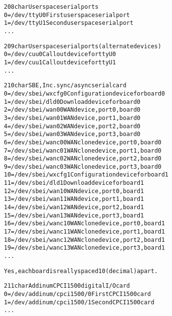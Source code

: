 \documentclass[a4paper,8pt,english]{sphinxmanual}
\begin{document}
\begin{alltt}
 208 char       User space serial ports
                  0 = /dev/ttyU0                First user space serial port
                  1 = /dev/ttyU1                Second user space serial port
                    ...

 209 char       User space serial ports (alternate devices)
                  0 = /dev/cuu0                 Callout device for ttyU0
                  1 = /dev/cuu1                 Callout device for ttyU1
                    ...

 210 char       SBE, Inc. sync/async serial card
                  0 = /dev/sbei/wxcfg0          Configuration device for board 0
                  1 = /dev/sbei/dld0            Download device for board 0
                  2 = /dev/sbei/wan00           WAN device, port 0, board 0
                  3 = /dev/sbei/wan01           WAN device, port 1, board 0
                  4 = /dev/sbei/wan02           WAN device, port 2, board 0
                  5 = /dev/sbei/wan03           WAN device, port 3, board 0
                  6 = /dev/sbei/wanc00          WAN clone device, port 0, board 0
                  7 = /dev/sbei/wanc01          WAN clone device, port 1, board 0
                  8 = /dev/sbei/wanc02          WAN clone device, port 2, board 0
                  9 = /dev/sbei/wanc03          WAN clone device, port 3, board 0
                 10 = /dev/sbei/wxcfg1          Configuration device for board 1
                 11 = /dev/sbei/dld1            Download device for board 1
                 12 = /dev/sbei/wan10           WAN device, port 0, board 1
                 13 = /dev/sbei/wan11           WAN device, port 1, board 1
                 14 = /dev/sbei/wan12           WAN device, port 2, board 1
                 15 = /dev/sbei/wan13           WAN device, port 3, board 1
                 16 = /dev/sbei/wanc10          WAN clone device, port 0, board 1
                 17 = /dev/sbei/wanc11          WAN clone device, port 1, board 1
                 18 = /dev/sbei/wanc12          WAN clone device, port 2, board 1
                 19 = /dev/sbei/wanc13          WAN clone device, port 3, board 1
                    ...

                Yes, each board is really spaced 10 (decimal) apart.

 211 char       Addinum CPCI1500 digital I/O card
                  0 = /dev/addinum/cpci1500/0   First CPCI1500 card
                  1 = /dev/addinum/cpci1500/1   Second CPCI1500 card
                    ...


\end{alltt}
\end{document}
